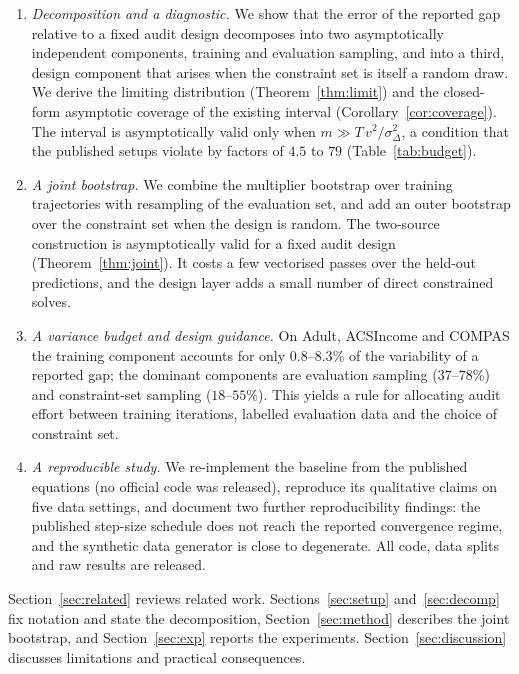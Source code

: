 \documentclass[pdflatex,sn-basic]{sn-jnl}
\begin{document}

\begin{enumerate}
  \item \emph{Decomposition and a diagnostic.}  We show that the error of the reported gap relative to
        a fixed audit design decomposes into two asymptotically independent components, training and
        evaluation sampling, and into a third, design component that arises when the constraint set is
        itself a random draw.  We derive the limiting distribution (Theorem~\ref{thm:limit}) and the
        closed-form asymptotic coverage of the existing interval (Corollary~\ref{cor:coverage}).  The
        interval is asymptotically valid only when $m \gg T\,v^2/\sigma^2_\Delta$, a condition that the published setups violate by factors of $4.5$ to $79$ (Table~\ref{tab:budget}).
  \item \emph{A joint bootstrap.}  We combine the multiplier bootstrap over training trajectories with
        resampling of the evaluation set, and add an outer bootstrap over the constraint set when the
        design is random.  The two-source construction is asymptotically valid for a fixed audit design
        (Theorem~\ref{thm:joint}).  It costs a few vectorised passes over the held-out predictions, and the
        design layer adds a small number of direct constrained solves.
  \item \emph{A variance budget and design guidance.}  On Adult, ACSIncome and COMPAS the training
        component accounts for only $0.8$--$8.3\%$ of the variability of a reported gap; the
        dominant components are evaluation sampling ($37$--$78\%$) and constraint-set sampling
        ($18$--$55\%$).  This yields a rule for allocating audit effort between training
        iterations, labelled evaluation data and the choice of constraint set.
  \item \emph{A reproducible study.}  We re-implement the baseline from the published equations
        (no official code was released), reproduce its qualitative claims on five data settings, and
        document two further reproducibility findings: the published step-size schedule does not reach the reported convergence regime, and the synthetic data generator is close to
        degenerate.  All code, data splits and raw results are released.
\end{enumerate}

Section~\ref{sec:related} reviews related work.  Sections~\ref{sec:setup} and~\ref{sec:decomp} fix notation and state the decomposition, Section~\ref{sec:method} describes the joint bootstrap, and Section~\ref{sec:exp} reports the experiments.  Section~\ref{sec:discussion} discusses limitations and practical consequences.
\end{document}

